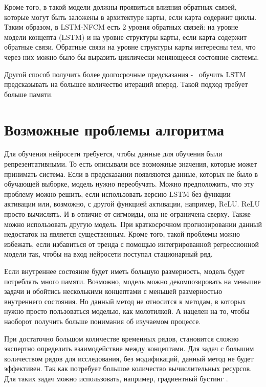 Кроме того, в такой модели должны проявиться влияния обратных связей, которые могут
быть заложены в архитектуре карты, если карта содержит циклы.
Таким образом, в LSTM-NFCM есть 2 уровня обратных связей:
на уровне модели концепта (LSTM) и на уровне структуры карты,
если карта содержит обратные связи.
Обратные связи на уровне структуры карты интересны тем, что
через них можно было бы выразить циклически меняющееся состояние системы.

Другой способ получить более долгосрочные предсказания -~ обучить LSTM
предсказывать на большее количество итераций вперед. Такой подход
требует больше памяти.

\section{Возможные проблемы алгоритма}

Для обучения  нейросети требуется, чтобы
данные для обучения были репрезентативными. То есть
описывали все возможные значения, которые может принимать система.
Если в предсказании появляются данные, которых не было в обучающей выборке,
модель нужно переобучать. Можно предположить, что эту проблему можно решить,
если использовать версию LSTM без функции активации или, возможно, с другой
функцией активации, например, ReLU. ReLU просто вычислять. И в отличие от
сигмоиды, она не ограничена сверху. Также можно использовать другую модель.
При краткосрочном прогнозировании данный недостаток на является существенным.
Кроме того, такой проблемы можно избежать, если избавиться от тренда с
помощью интегрированной регрессионной модели так, чтобы на вход нейросети
поступал стационарный ряд.

Если внутреннее состояние будет иметь большую размерность,
модель будет потреблять много памяти. Возможно, модель можно
декомпозировать на меньшие задачи и обойтись несколькими концептами
с меньшей размерностью внутреннего состояния.
Но данный метод не относится к методам, в которых нужно просто
пользоваться моделью, как молотилкой. А нацелен на то, чтобы наоборот
получить больше понимания об изучаемом процессе.

При достаточно большом количестве временных рядов,
становится сложно экспертно определить взаимодействие между концептами.
Для задач с большим количеством рядов для исследования, без
модификаций, данный метод не будет эффективен. Так как потребует
большое количество вычислительных ресурсов.
Для таких задач можно использовать, например, градиентный бустинг \cite{friedman2002stochastic}.

